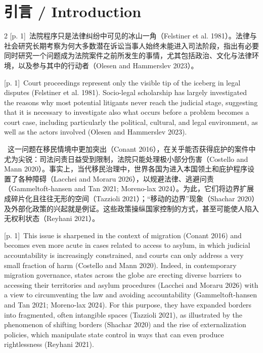 \documentclass[10pt,a4paper]{article}
\begin{document}
\section*{引言 / Introduction}
\begin{paracol}{2}
{\scriptsize\color{gray} [p. 1]}\ 法院程序只是法律纠纷中可见的冰山一角（Felstiner et al. 1981）。法律与社会研究长期考察为何大多数潜在诉讼当事人始终未能进入司法阶段，指出有必要同时研究一个问题成为法院案件之前所发生的事情，尤其包括政治、文化与法律环境，以及参与其中的行动者（Olesen and Hammerslev 2023）。\par
\switchcolumn
{\scriptsize\color{gray} [p. 1]}\ Court proceedings represent only the visible tip of the iceberg in legal disputes (Felstiner et al. 1981). Socio-legal scholarship has largely investigated the reasons why most potential litigants never reach the judicial stage, suggesting that it is necessary to investigate also what occurs before a problem becomes a court case, including particularly the political, cultural, and legal environment, as well as the actors involved (Olesen and Hammerslev 2023).\par
\switchcolumn*
{\scriptsize\color{gray} [p. 1]}\ 这一问题在移民情境中更加突出（Conant 2016），在关乎能否获得庇护的案件中尤为尖锐：司法问责日益受到限制，法院只能处理极小部分伤害（Costello and Mann 2020）。事实上，当代移民治理中，世界各国为进入本国领土和庇护程序设置了各种障碍（Lacchei and Moraru 2026），以规避法律、逃避问责（Gammeltoft-hansen and Tan 2021; Moreno-lax 2024）。为此，它们将边界扩展成碎片化且往往无形的空间（Tazzioli 2021）；“移动的边界”现象（Shachar 2020）及外部化政策的兴起就是例证。这些政策操纵国家控制的方式，甚至可能使人陷入无权利状态（Reyhani 2021）。\par
\switchcolumn
{\scriptsize\color{gray} [p. 1]}\ This issue is sharpened in the context of migration (Conant 2016) and becomes even more acute in cases related to access to asylum, in which judicial accountability is increasingly constrained, and courts can only address a very small fraction of harm (Costello and Mann 2020). Indeed, in contemporary migration governance, states across the globe are erecting diverse barriers to accessing their territories and asylum procedures (Lacchei and Moraru 2026) with a view to circumventing the law and avoiding accountability (Gammeltoft-hansen and Tan 2021; Moreno-lax 2024). For this purpose, they have expanded borders into fragmented, often intangible spaces (Tazzioli 2021), as illustrated by the phenomenon of shifting borders (Shachar 2020) and the rise of externalization policies, which manipulate state control in ways that can even produce rightlessness (Reyhani 2021).\par

\end{paracol}
\end{document}
